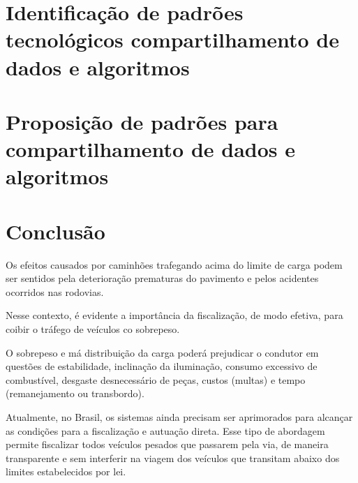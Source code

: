 \documentclass{ufscThesis}
\begin{document}

\chapter{Identificação de padrões tecnológicos compartilhamento de dados e algoritmos}\label{id-tech-standards}


\chapter{Proposição de padrões para compartilhamento de dados e algoritmos}\label{standards-proposition}


\chapter{Conclusão}\label{conclusao}

Os efeitos causados por caminhões trafegando acima do limite de carga podem ser sentidos pela deterioração prematuras do pavimento e pelos acidentes ocorridos nas rodovias.

Nesse contexto, é evidente a importância da fiscalização, de modo efetiva, para coibir o tráfego de veículos co sobrepeso.

O sobrepeso e má distribuição da carga poderá prejudicar o condutor em questões de estabilidade, inclinação da iluminação, consumo excessivo de combustível, desgaste desnecessário de peças, custos (multas) e tempo (remanejamento ou transbordo).

Atualmente, no Brasil, os sistemas ainda precisam ser aprimorados para alcançar as condições para a fiscalização e autuação direta. Esse tipo de abordagem permite fiscalizar todos veículos pesados que passarem pela via, de maneira transparente e sem interferir na viagem dos veículos que transitam abaixo dos limites estabelecidos por lei.






\end{document}
